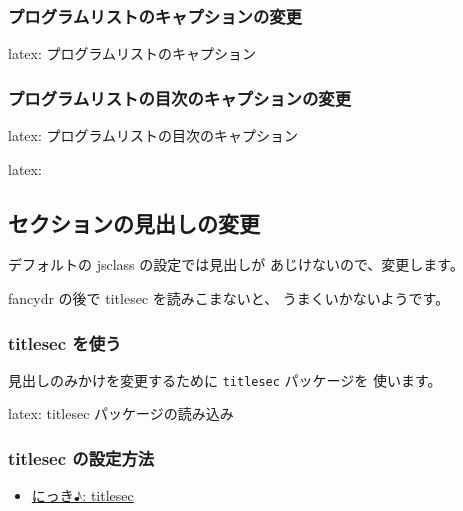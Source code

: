 \documentclass[dvipdfmx,a4j,14pt,uplatex]{jsarticle}
\begin{document}
\subsubsection{プログラムリストのキャプションの変更}
\label{sec:org7bd505c}
\begin{programlist}[label={org8212663}]{latex}{: プログラムリストのキャプション}\renewcommand\listingscaption{プログラムコード}
\end{programlist}

\subsubsection{プログラムリストの目次のキャプションの変更}
\label{sec:org2ebe5c4}
\begin{programlist}[label={org01f37bd}]{latex}{: プログラムリストの目次のキャプション}\renewcommand\listoflistingscaption{プログラムコードのリスト}
\end{programlist}

\begin{programlist}[label={nil}]{latex}{: }
\end{programlist}

\subsection{セクションの見出しの変更}
\label{sec:org7916ecf}
デフォルトの jsclass の設定では見出しが
あじけないので、変更します。

fancydr の後で titlesec を読みこまないと、
うまくいかないようです。

\subsubsection{titlesec を使う}
\label{sec:org6461744}
見出しのみかけを変更するために \texttt{titlesec} パッケージを
使います。

\begin{programlist}[label={org334ec72}]{latex}{: titlesec パッケージの読み込み}\usepackage{titlesec}
\end{programlist}
\subsubsection{titlesec の設定方法}
\label{sec:orgeaaf4dd}
\begin{itemize}
\item \href{http://abenori.blogspot.com/2018/05/titlesec.html}{にっき♪: titlesec}
\end{itemize}
\end{document}
